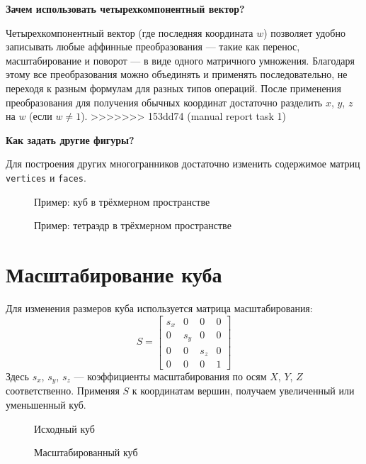 \textbf{Зачем использовать четырехкомпонентный вектор?}

Четырехкомпонентный вектор (где последняя координата $w$) позволяет удобно записывать любые аффинные преобразования — такие как перенос, масштабирование и поворот — в виде одного матричного умножения. Благодаря этому все преобразования можно объединять и применять последовательно, не переходя к разным формулам для разных типов операций. После применения преобразования для получения обычных координат достаточно разделить $x$, $y$, $z$ на $w$ (если $w \neq 1$).
>>>>>>> 153dd74 (manual report task 1)

\textbf{Как задать другие фигуры?}

Для построения других многогранников достаточно изменить содержимое матриц \texttt{vertices} и \texttt{faces}.

\begin{figure}[h!]
    \centering
    \caption{Пример: куб в трёхмерном пространстве}
\end{figure}

\begin{figure}[h!]
    \centering
    \caption{Пример: тетраэдр в трёхмерном пространстве}
\end{figure}

\section{Масштабирование куба}

Для изменения размеров куба используется матрица масштабирования:
\[
S = \begin{bmatrix}
    s_x & 0 & 0 & 0 \\
    0 & s_y & 0 & 0 \\
    0 & 0 & s_z & 0 \\
    0 & 0 & 0 & 1
\end{bmatrix}
\]
Здесь $s_x$, $s_y$, $s_z$ --- коэффициенты масштабирования по осям $X$, $Y$, $Z$ соответственно. Применяя $S$ к координатам вершин, получаем увеличенный или уменьшенный куб.

\begin{figure}[h!]
    \centering
    \caption{Исходный куб}
\end{figure}

\begin{figure}[h!]
    \centering
    \caption{Масштабированный куб}
\end{figure}

